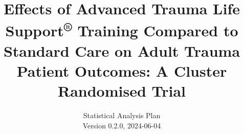 \documentclass[
]{scrartcl}
\title{Effects of Advanced Trauma Life Support\textsuperscript{®}
Training Compared to Standard Care on Adult Trauma Patient Outcomes: A
Cluster Randomised Trial}
\subtitle{Statistical Analysis Plan\\
Version 0.2.0, 2024-06-04}
\author{}
\date{}
\begin{document}


\begin{titlepage}


\newcommand{\titlepagepagealign}{
\ifthenelse{\equal{center}{right}}{\raggedleft}{}
\ifthenelse{\equal{center}{center}}{\centering}{}
\ifthenelse{\equal{center}{left}}{\raggedright}{}
}


\newcommand{\titleandsubtitle}{
{\fontsize{20}{24.0}\selectfont
{\uppercase{\nohyphens{Effects of Advanced Trauma Life
Support\textsuperscript{®} Training Compared to Standard Care on Adult
Trauma Patient Outcomes: A Cluster Randomised Trial}}}\par
}%

\vspace{\betweentitlesubtitle}
{
{\Large{\nohyphens{Statistical Analysis Plan\\
Version 0.2.0, 2024-06-04}}}\par
}}
\newcommand{\titlepagetitleblock}{
\rule{\textwidth}{0.4pt} %
\vspace{0.025\textheight} %

\titleandsubtitle

\vspace{0.025\textheight} 
\rule{0.3\textwidth}{0.4pt} %
}
\newcommand{\authorstyle}[1]{{\Large{#1}}}

\newcommand{\affiliationstyle}[1]{{\large{#1}}}

\newcommand{\titlepageauthorblock}{
{\authorstyle{\\}}
}

\newcommand{\titlepageaffiliationblock}{
\hangindent=1em
\hangafter=1
{\affiliationstyle{


\vspace{1\baselineskip} 
}}
}
\newcommand{\headerstyled}{%
{}
}
\newcommand{\footerstyled}{%
{\large{\textsc{}}}
}
\newcommand{\datestyled}{%
{}
}


\newcommand{\titlepageheaderblock}{\headerstyled}

\newcommand{\titlepagefooterblock}{
\footerstyled
}

\newcommand{\titlepagedateblock}{
\datestyled
}

\newcommand{\titleblock}{\newlength{\betweentitlesubtitle}
\setlength{\betweentitlesubtitle}{\baselineskip}
{

}}
\end{titlepage}
\end{document}
